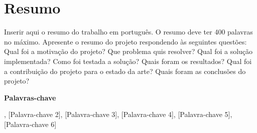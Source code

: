 %


\chapter*{Resumo}

Inserir aqui o resumo do trabalho em português. O resumo deve ter 400 palavras no máximo. Apresente o resumo do projeto respondendo às seguintes questões: Qual foi a motivação do projeto? Que problema quis resolver? Qual foi a solução implementada? Como foi testada a solução? Quais foram os resultados? Qual foi a contribuição do projeto para o estado da arte? Quais foram as conclusões do projeto?

\vspace{1cm}

\noindent\textbf{Palavras-chave}

, [Palavra-chave 2], [Palavra-chave 3], [Palavra-chave 4], [Palavra-chave 5], [Palavra-chave 6]


\cleardoublepage
